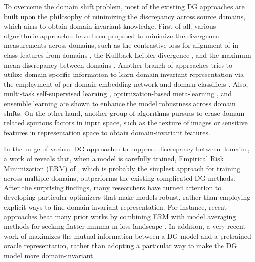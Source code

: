 \documentclass[letterpaper]{article} \usepackage{aaai23}  \usepackage{times}  \usepackage{helvet}  \usepackage{courier}  \usepackage[hyphens]{url}  \usepackage{graphicx} \urlstyle{rm} \def\UrlFont{\rm}  \usepackage{natbib}  \usepackage{caption} \frenchspacing  \setlength{\pdfpagewidth}{8.5in}  \setlength{\pdfpageheight}{11in}  \usepackage[labelsep=period]{caption}
\begin{document}
To overcome the domain shift problem, most of the existing DG approaches are built upon the philosophy of minimizing the discrepancy across source domains, which aims to obtain domain-invariant knowledge.
First of all, various algorithmic approaches have been proposed to minimize the divergence measurements across domains, such as 
the contrastive loss for alignment of in-class features from domains \cite{contrastive1,MASF}, the Kullback-Leibler divergence \cite{kullback1951information,MASF}, and the maximum mean discrepancy between domains \cite{MMD,MMD_DG}.
Another branch of approaches tries to utilize domain-specific information to learn domain-invariant representation via the employment of per-domain embedding network \cite{DSN} and domain classifiers \cite{AD_DA1}. 
Also, multi-task self-supervised learning \cite{multi-generalization,extrinsic_supervision_DG_MTL,jigsaw_DG_MTL}, optimization-based meta-learning \cite{MLDG, MASF}, and ensemble learning \cite{EoA,bestsource,ensemble1} are shown to enhance the model robustness across domain shifts.
On the other hand, another group of algorithms pursues to erase domain-related spurious factors in input space, such as the texture of images \cite{regular_1} or sensitive features in representation space \cite{RSC} to obtain domain-invariant features.






In the surge of various DG approaches to suppress discrepancy between domains, a work of \cite{Domainbed} reveals that, when a model is carefully trained, Empirical Risk Minimization (ERM) of \cite{ERM}, which is probably the simplest approach for training across multiple domains, outperforms the existing complicated DG methods.
After the surprising findings, many researchers have turned attention to developing particular optimizers that make models robust, rather than employing explicit ways to find domain-invariant representation.
For instance, recent approaches beat many prior works by combining ERM with model averaging methods for seeking flatter minima in loss landscape \cite{swa,SWAD}.
In addition, a very recent work of \cite{MIRO} maximizes the mutual information between a DG model and a pretrained oracle representation, rather than adopting a particular way to make the DG model more domain-invariant.
\end{document}
